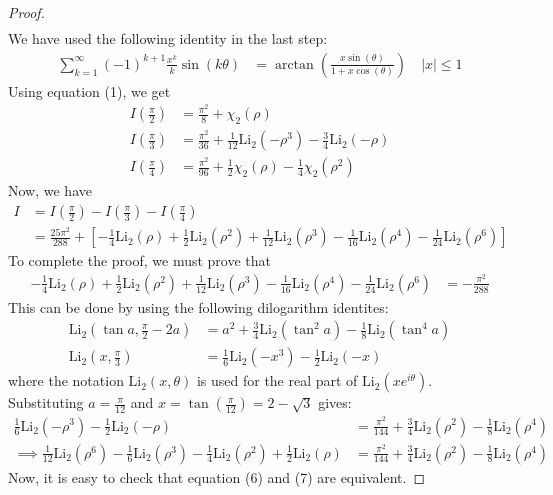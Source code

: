 \begin{proof}
\begin{align*}
\end{align*}
We have used the following identity in the last step:
\begin{align*}
\sum_{k=1}^\infty (-1)^{k+1}\frac{x^k}{k}\sin(k\theta) &= \arctan\left(\frac{x \sin(\theta)}{1+x\cos(\theta)}\right) \quad |x| \leq 1
\end{align*}
Using equation (1), we get
\begin{align*}
I\left(\frac{\pi}{2}\right) &= \frac{\pi^2}{8}+\chi_2\left(\rho\right) \tag{2}\\
I\left(\frac{\pi}{3}\right) &= \frac{\pi^2}{36}+\frac{1}{12}\text{Li}_2\left( -\rho^3\right) -\frac{3}{4}\text{Li}_2\left(-\rho \right) \tag{3}\\
I\left(\frac{\pi}{4}\right) &= \frac{\pi^2}{96}+\frac{1}{2}\chi_2\left(\rho\right)-\frac{1}{4}\chi_2\left(\rho^2\right) \tag{4}
\end{align*}
Now, we have
\begin{align*}
I &= I\left(\frac{\pi}{2}\right)-I\left(\frac{\pi}{3}\right)-I\left(\frac{\pi}{4}\right) \\
&= \frac{25\pi^2}{288} + \left[-\frac{1}{4}\text{Li}_2(\rho)+\frac{1}{2}\text{Li}_2(\rho^2)+\frac{1}{12}\text{Li}_2(\rho^3)-\frac{1}{16}\text{Li}_2(\rho^4)-\frac{1}{24}\text{Li}_2(\rho^6) \right]\tag{5}
\end{align*}
To complete the proof, we must prove that
\begin{align*}
-\frac{1}{4}\text{Li}_2(\rho)+\frac{1}{2}\text{Li}_2(\rho^2)+\frac{1}{12}\text{Li}_2(\rho^3)-\frac{1}{16}\text{Li}_2(\rho^4)-\frac{1}{24}\text{Li}_2(\rho^6) &= -\frac{\pi^2}{288} \tag{6}
\end{align*}
This can be done by using the following dilogarithm identites:
\begin{align*}
\text{Li}_2 \left(\tan a, \frac{\pi}{2}-2a \right) &= a^2 +\frac{3}{4}\text{Li}_2(\tan^2 a) -\frac{1}{8}\text{Li}_2(\tan^4 a) \\
\text{Li}_2\left(x,\frac{\pi}{3}\right) &= \frac{1}{6} \text{Li}_2(-x^3) -\frac{1}{2}\text{Li}_2(-x)
\end{align*}
where the notation $\text{Li}_2(x,\theta)$ is used for the real part of $\text{Li}_2(xe^{i\theta})$.
Substituting $a=\frac{\pi}{12}$ and $x=\tan\left(\frac{\pi}{12}\right)=2-\sqrt{3}$ gives:
\begin{align*}
\frac{1}{6}\text{Li}_2(-\rho^3)-\frac{1}{2}\text{Li}_2(-\rho) &= \frac{\pi^2}{144} + \frac{3}{4}\text{Li}_2(\rho^2)-\frac{1}{8}\text{Li}_2(\rho^4) \\
\implies  \frac{1}{12}\text{Li}_2(\rho^6)-\frac{1}{6}\text{Li}_2(\rho^3) -\frac{1}{4}\text{Li}_2(\rho^2) +\frac{1}{2} \text{Li}_2(\rho)&= \frac{\pi^2}{144} + \frac{3}{4}\text{Li}_2(\rho^2)-\frac{1}{8}\text{Li}_2(\rho^4) \tag{7}
\end{align*}
Now, it is easy to check that equation (6) and (7) are equivalent.
\end{proof}
